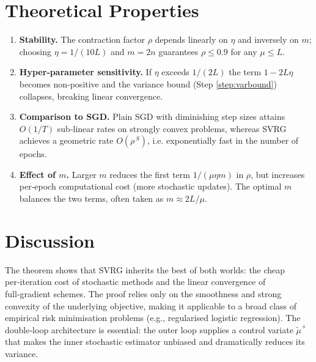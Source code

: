 \documentclass{article}
\begin{document}
\section*{Theoretical Properties}
\begin{enumerate}[label=\textbf{P\arabic*:}, leftmargin=*]
\item \textbf{Stability.} The contraction factor $\rho$ depends linearly on $\eta$ and inversely on $m$; choosing $\eta=1/(10L)$ and $m=2n$ guarantees $\rho\le 0.9$ for any $\mu\le L$.
\item \textbf{Hyper‑parameter sensitivity.} If $\eta$ exceeds $1/(2L)$ the term $1-2L\eta$ becomes non‑positive and the variance bound (Step \ref{step:varbound}) collapses, breaking linear convergence.
\item \textbf{Comparison to SGD.} Plain SGD with diminishing step sizes attains $O(1/T)$ sub‑linear rates on strongly convex problems, whereas SVRG achieves a geometric rate $O(\rho^{\,S})$, i.e. exponentially fast in the number of epochs.
\item \textbf{Effect of $m$.} Larger $m$ reduces the first term $1/(\mu\eta m)$ in $\rho$, but increases per‑epoch computational cost (more stochastic updates). The optimal $m$ balances the two terms, often taken as $m\approx 2L/\mu$.
\end{enumerate}

\section*{Discussion}
The theorem shows that SVRG inherits the best of both worlds: the cheap per‑iteration cost of stochastic methods and the linear convergence of full‑gradient schemes. The proof relies only on the smoothness and strong convexity of the underlying objective, making it applicable to a broad class of empirical risk minimisation problems (e.g., regularised logistic regression). The double‑loop architecture is essential: the outer loop supplies a control variate $\tilde{\mu}^{\,s}$ that makes the inner stochastic estimator unbiased and dramatically reduces its variance.
\end{document}
